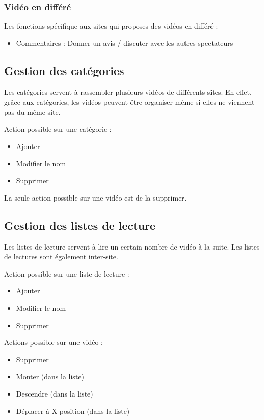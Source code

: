 \documentclass[11pt]{report} %
\begin{document}
			\subsubsection{Vidéo en différé}
			Les fonctions spécifique aux sites qui proposes des vidéos en différé :
			\begin{itemize}
				\item Commentaires : Donner un avis / discuter avec les autres spectateurs
			\end{itemize}
	
		\subsection{Gestion des catégories}
		Les catégories servent à rassembler plusieurs vidéos de différents sites. En effet, grâce aux catégories, les vidéos peuvent être organiser même si elles ne viennent pas du même site.
		
		Action possible sur une catégorie :
		\begin{itemize}
			\item Ajouter
			\item Modifier le nom
			\item Supprimer
		\end{itemize}
		
		La seule action possible sur une vidéo est de la supprimer.
		
		\subsection{Gestion des listes de lecture}
		Les listes de lecture servent à lire un certain nombre de vidéo à la suite. Les listes de lectures sont également inter-site.
		
		Action possible sur une liste de lecture :
		\begin{itemize}
			\item Ajouter
			\item Modifier le nom
			\item Supprimer
		\end{itemize}
		
		Actions possible sur une vidéo :
		\begin{itemize}
			\item Supprimer
			\item Monter (dans la liste)
			\item Descendre (dans la liste)
			\item Déplacer à X position (dans la liste)
		\end{itemize}
		
\end{document}
